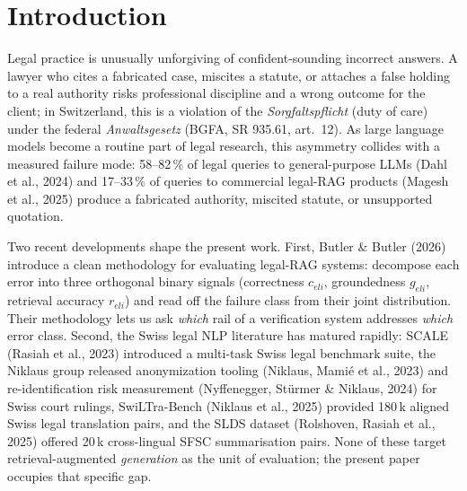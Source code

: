 \documentclass[11pt,a4paper]{article}
\begin{document}

\section{Introduction}
\label{sec:intro}

Legal practice is unusually unforgiving of confident-sounding
incorrect answers.  A lawyer who cites a fabricated case, miscites a
statute, or attaches a false holding to a real authority risks
professional discipline and a wrong outcome for the client; in
Switzerland, this is a violation of the \emph{Sorgfaltspflicht}
(duty of care) under the federal \emph{Anwaltsgesetz} (BGFA, SR
935.61, art.~12).  As large language models become a routine part of
legal research, this asymmetry collides with a measured failure
mode: 58--82\,\% of legal queries to general-purpose LLMs (Dahl et
al., 2024) and 17--33\,\% of queries to commercial legal-RAG products
(Magesh et al., 2025) produce a fabricated authority, miscited
statute, or unsupported quotation.

Two recent developments shape the present work.  First, Butler \&
Butler (2026) introduce a clean methodology for evaluating legal-RAG
systems: decompose each error into three orthogonal binary signals
(correctness $c_{eli}$, groundedness $g_{eli}$, retrieval accuracy
$r_{eli}$) and read off the failure class from their joint
distribution.  Their methodology lets us ask \emph{which} rail of a
verification system addresses \emph{which} error class.  Second, the
Swiss legal NLP literature has matured rapidly: SCALE (Rasiah et
al., 2023) introduced a multi-task Swiss legal benchmark suite, the
Niklaus group released anonymization tooling (Niklaus, Mami{\'e} et
al., 2023) and re-identification risk measurement (Nyffenegger,
St{\"u}rmer \& Niklaus, 2024) for Swiss court rulings, SwiLTra-Bench
(Niklaus et al., 2025) provided 180\,k aligned Swiss legal
translation pairs, and the SLDS dataset (Rolshoven, Rasiah et al.,
2025) offered 20\,k cross-lingual SFSC summarisation pairs.  None of
these target retrieval-augmented \emph{generation} as the unit of
evaluation; the present paper occupies that specific gap.
\end{document}
